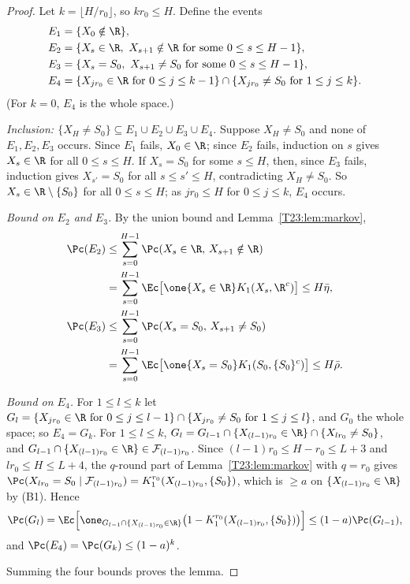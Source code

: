\documentclass[11pt]{report}
\begin{document}
\begin{proof}
Let $k=\lfloor H/r_0\rfloor$, so $kr_0\le H$. Define the events
\begin{align*}
E_1&=\{X_0\notin\R\},\\
E_2&=\{X_s\in\R,\ X_{s+1}\notin\R\ \text{for some }0\le s\le H-1\},\\
E_3&=\{X_s=S_0,\ X_{s+1}\neq S_0\ \text{for some }0\le s\le H-1\},\\
E_4&=\{X_{jr_0}\in\R\ \text{for }0\le j\le k-1\}\cap\{X_{jr_0}\neq S_0\ \text{for }1\le j\le k\}.
\end{align*}
(For $k=0$, $E_4$ is the whole space.)

\emph{Inclusion: $\{X_H\neq S_0\}\subseteq E_1\cup E_2\cup E_3\cup E_4$.}
Suppose $X_H\ne S_0$ and none of $E_1,E_2,E_3$ occurs. Since $E_1$ fails, $X_0\in\R$; since $E_2$ fails, induction on $s$ gives $X_s\in\R$ for all $0\le s\le H$. If $X_s=S_0$ for some $s\le H$, then, since $E_3$ fails, induction gives $X_{s'}=S_0$ for all $s\le s'\le H$, contradicting $X_H\neq S_0$. So $X_s\in\R\setminus\{S_0\}$ for all $0\le s\le H$; as $jr_0\le H$ for $0\le j\le k$, $E_4$ occurs.

\emph{Bound on $E_2$ and $E_3$.} By the union bound and Lemma~\ref{T23:lem:markov},
\begin{align*}
\Pc(E_2)&\le\sum_{s=0}^{H-1}\Pc(X_s\in\R,\,X_{s+1}\notin\R)\\&=\sum_{s=0}^{H-1}\Ec\bigl[\one\{X_s\in\R\}K_1(X_s,\R^c)\bigr]\le H\bar\eta,\\
\Pc(E_3)&\le\sum_{s=0}^{H-1}\Pc(X_s=S_0,\,X_{s+1}\ne S_0)\\&=\sum_{s=0}^{H-1}\Ec\bigl[\one\{X_s=S_0\}K_1(S_0,\{S_0\}^c)\bigr]\le H\bar\rho .
\end{align*}

\emph{Bound on $E_4$.} For $1\le l\le k$ let $G_l=\{X_{jr_0}\in\R\text{ for }0\le j\le l-1\}\cap\{X_{jr_0}\ne S_0\text{ for }1\le j\le l\}$, and $G_0$ the whole space; so $E_4=G_k$. For $1\le l\le k$, $G_l=G_{l-1}\cap\{X_{(l-1)r_0}\in\R\}\cap\{X_{lr_0}\neq S_0\}$, and $G_{l-1}\cap\{X_{(l-1)r_0}\in\R\}\in\mathcal F_{(l-1)r_0}$. Since $(l-1)r_0\le H-r_0\le L+3$ and $lr_0\le H\le L+4$, the $q$-round part of Lemma~\ref{T23:lem:markov} with $q=r_0$ gives $\Pc(X_{lr_0}=S_0\mid\mathcal F_{(l-1)r_0})=K_1^{r_0}(X_{(l-1)r_0},\{S_0\})$, which is $\ge a$ on $\{X_{(l-1)r_0}\in\R\}$ by (B1). Hence
\[
\Pc(G_l)=\Ec\Bigl[\one_{G_{l-1}\cap\{X_{(l-1)r_0}\in\R\}}\bigl(1-K_1^{r_0}(X_{(l-1)r_0},\{S_0\})\bigr)\Bigr]\le(1-a)\Pc(G_{l-1}),
\]
and $\Pc(E_4)=\Pc(G_k)\le(1-a)^k$.

Summing the four bounds proves the lemma.
\end{proof}
\end{document}
